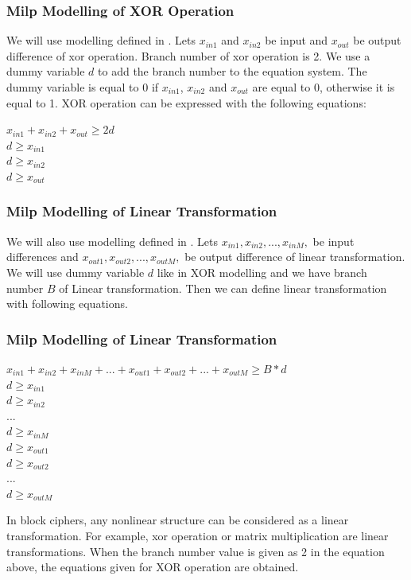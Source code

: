 \documentclass{beamer}
\begin{document}
\begin{frame}
\frametitle{Milp Modelling of XOR Operation }

We will use modelling defined in \cite{mouha2012differential}. Lets $x_{in1}$ and $x_{in2}$ be input and $x_{out}$ be output difference of xor operation. Branch number of xor operation is 2. We use a dummy variable $d$ to add the branch number to the equation system. The dummy variable is equal to 0 if $x_{in1}$, $x_{in2}$ and $x_{out}$ are equal to 0, otherwise it is equal to 1. XOR operation can be expressed with the following equations:

\begin{center}
    $x_{in1} + x_{in2} + x_{out} \geq 2d $ \\
    $d \geq x_{in1} $ \\
    $d \geq x_{in2} $ \\
    $d \geq x_{out} $ 
\end{center}

\end{frame}
\begin{frame}
\frametitle{Milp Modelling of Linear Transformation }

We will also use modelling defined in \cite{mouha2012differential}. Lets $x_{in1}, x_{in2}, ... ,x_{inM}, $ be input differences and $x_{out1}, x_{out2}, ... ,x_{outM}, $ be output difference of linear transformation. We will use dummy variable $d$ like in XOR modelling and we have branch number $B$ of Linear transformation. Then we can define linear transformation with following equations. 

\end{frame}
\begin{frame}
\frametitle{Milp Modelling of Linear Transformation }

\begin{center}
    $x_{in1} + x_{in2} + x_{inM} + ... + x_{out1} + x_{out2} + ... + x_{outM}  \geq B*d $ \\
    $d \geq x_{in1} $ \\
    $d \geq x_{in2} $ \\
    $...$\\
    $d \geq x_{inM} $ \\
    $d \geq x_{out1} $\\
    $d \geq x_{out2} $ \\
    $...$\\
    $d \geq x_{outM} $
\end{center}

In block ciphers, any nonlinear structure can be considered as a linear transformation. For example, xor operation or matrix multiplication are linear transformations. When the branch number value is given as 2 in the equation above, the equations given for XOR operation are obtained.

\end{frame}
\end{document}
